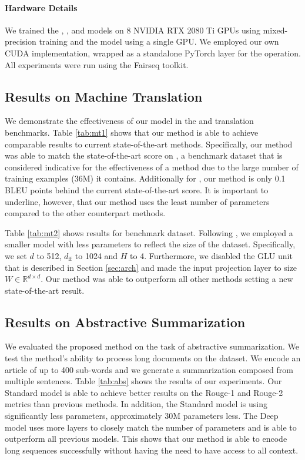 \documentclass{article}
\begin{document}
\paragraph{Hardware Details} We trained the \ende{}, \enfr{}, \cnndm{} and \wiki{} models on 8 NVIDIA RTX 2080 Ti GPUs using mixed-precision training \cite{DBLP:journals/corr/abs-1710-03740} and the \iwslt{} model using a single GPU. We employed our own CUDA implementation, wrapped as a standalone PyTorch layer for the \talkconvfull{} operation. All experiments were run using the Fairseq \cite{ott2019fairseq} toolkit.


\subsection{Results on Machine Translation}

We demonstrate the effectiveness of our model in the \ende{} and \enfr{} translation benchmarks. Table \ref{tab:mt1} shows that our method is able to achieve comparable results to current state-of-the-art methods. Specifically, our method was able to match the state-of-the-art score on \enfr{}, a benchmark dataset that is considered indicative for the effectiveness of a method due to the large number of training examples (36M) it contains. Additionally for \ende{}, our method is only 0.1 BLEU points behind the current state-of-the-art score. 
It is important to underline, however, that our method uses the least number of parameters compared to the other counterpart methods.

Table \ref{tab:mt2} shows results for \iwslt{} benchmark dataset. Following \citet{wu2019pay}, we employed a smaller model with less parameters to reflect the size of the dataset. Specifically, we set $d$ to 512, $d_{\text{ff}}$ to 1024 and $H$ to 4. Furthermore, we disabled the GLU unit that is described in Section \ref{sec:arch} and made the input projection layer to size $W \in \mathbb{R}^{d{\times}d}$. Our method was able to outperform all other methods setting a new state-of-the-art result. 

\subsection{Results on Abstractive Summarization}
We evaluated the proposed method on the task of abstractive summarization. We test the method's ability to process long documents on the \cnndm{} dataset. We encode an article of up to 400 sub-words and we generate a summarization composed from multiple sentences. Table \ref{tab:abs} shows the results of our experiments. Our Standard model is able to achieve better results on the Rouge-1 and Rouge-2 metrics than previous methods. In addition, the Standard model is using significantly less parameters, approximately 30M parameters less. The Deep model uses more layers to closely match the number of parameters and is able to outperform all previous models. This shows that our method is able to encode long sequences successfully without having the need to have access to all context.
\end{document}
